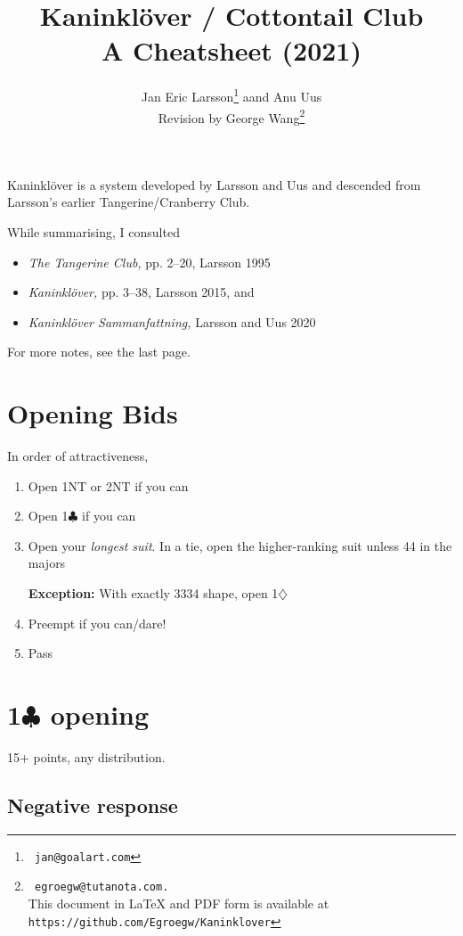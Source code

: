 \documentclass[a4paper, twoside, 11pt]{article}
\title{Kaninklöver / Cottontail Club\\A Cheatsheet (2021)}
\author{
Jan Eric Larsson\footnote{\normalsize{\texttt{ jan@goalart.com}}} \hphantom aand Anu Uus \\
Revision by George Wang\footnote{\normalsize{\texttt{ egroegw@tutanota.com.} \\
This document  in LaTeX and PDF form is available at \texttt{https://github.com/Egroegw/Kaninklover}}}
}
\date{}
\begin{document}
\maketitle

\vspace{0cm}
\begin{multicols}{3}

\itshape

Kaninklöver is a system developed by Larsson and Uus and descended from Larsson's earlier Tangerine/Cranberry Club.

While summarising, I consulted
\begin{itemize}
    \item \emph{The Tangerine Club,} pp. 2--20, Larsson 1995
    \item \emph{Kaninklöver,} pp. 3--38, Larsson 2015, and
    \item \emph{Kaninklöver Sammanfattning,} Larsson and Uus 2020
\end{itemize}

For more notes, see the last page.

\upshape
\section{Opening Bids}
In order of attractiveness,
\begin{enumerate}
    \item Open 1NT or 2NT if you can
    \item Open 1$\clubsuit$ if you can
    \item Open your \textit{longest suit}.
    In a tie, open the higher-ranking suit unless 44 in the majors

     \textbf{Exception:} With exactly 3334 shape, open 1$\diamondsuit$
    \item Preempt if you can/dare!
    \item Pass
\end{enumerate}



\section{1$\clubsuit$ opening}

15+ points, any distribution.


\subsection*{Negative response}


\end{multicols}
\end{document}
